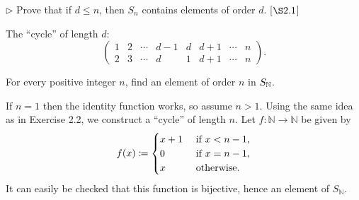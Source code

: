 \begin{exercise}
	$\triangleright$ Prove that if $d\leq n$, then $S_n$ contains elements of order $d$. [$\S 2.1$]
\end{exercise}
\begin{solution}
	The ``cycle'' of length $d$:
	\[ 
		\begin{pmatrix}
			1 & 2 & \cdots & d - 1 & d & d+1 & \cdots & n\\
			2 & 3 & \cdots & d & 1 & d + 1 & \cdots & n
		\end{pmatrix}.
	\]
\end{solution}

\begin{exercise}
	For every positive integer $n$, find an element of order $n$ in $S_{\mathbb{N}}$.
\end{exercise}
\begin{solution}
	If $n=1$ then the identity function works, so assume $n>1$. Using the same idea as in Exercise 2.2, we construct a ``cycle'' of length $n$. Let $f\colon \mathbb{N} \to \mathbb{N}$ be given by
	\[
		f(x) \coloneqq 
		\begin{cases}
			x + 1 & \textnormal{ if }x< n-1,\\
			0 & \textnormal{ if }x = n-1,\\
			x & \textnormal{ otherwise.}
		\end{cases}
	\]
	It can easily be checked that this function is bijective, hence an element of $S_\mathbb{N}$.
\end{solution}


